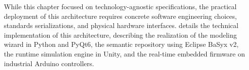 While this chapter focused on technology-agnostic specifications, the practical deployment of this architecture requires concrete software engineering choices, standards serializations, and physical hardware interfaces.  details the technical implementation of this architecture, describing the realization of the modeling wizard in Python and PyQt6, the semantic repository using Eclipse BaSyx v2, the runtime simulation engine in Unity, and the real-time embedded firmware on industrial Arduino controllers.



